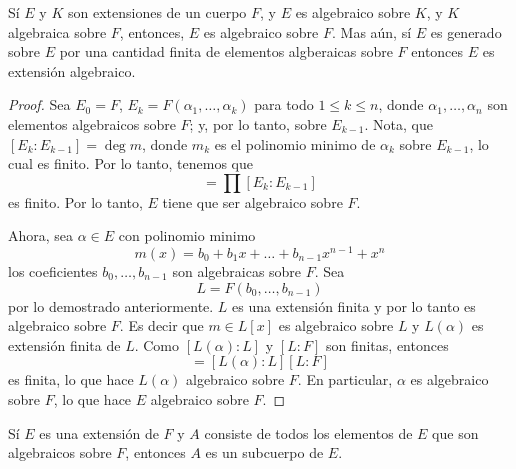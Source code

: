 \begin{lemma}\label{lemma_88}
    S\'i $E$ y  $K$ son extensiones de un cuerpo  $F$, y  $E$ es algebraico
    sobre  $K$, y  $K$ algebraica sobre  $F$, entonces,  $E$ es algebraico sobre
     $F$. Mas a\'un, s\'i  $E$ es generado sobre  $E$ por una cantidad finita de
     elementos algberaicas sobre  $F$ entonces  $E$ es extensi\'on algebraico.
\end{lemma}
\begin{proof}
    Sea $E_0=F$, $E_k=F(\alpha_1, \dots, \alpha_k)$ para todo $1 \leq k \leq n$,
    donde  $\alpha_1, \dots, \alpha_n$ son elementos algebraicos sobre $F$; y,
    por lo tanto, sobre $E_{k-1}$. Nota, que $[E_k:E_{k-1}]=\deg{m}$, donde $m_k$
    es el polinomio minimo de  $\alpha_k$ sobre $E_{k-1}$, lo cual es finito.
    Por lo tanto, tenemos que
    \begin{equation*}
        [E:F]=\prod{[E_k:E_{k-1}]}
    \end{equation*}
    es finito. Por lo tanto, $E$ tiene que ser algebraico sobre  $F$.

    Ahora, sea $\alpha \in E$ con polinomio minimo
    \begin{equation*}
        m(x)=b_0+b_1x+\dots+b_{n-1}x^{n-1}+x^n
    \end{equation*}
    los coeficientes $b_0, \dots, b_{n-1}$ son algebraicas sobre $F$. Sea
    \begin{equation*}
        L=F(b_0, \dots, b_{n-1})
    \end{equation*}
    por lo demostrado anteriormente. $L$ es una extensi\'on finita y por lo
    tanto es algebraico sobre  $F$. Es decir que  $m \in L[x]$ es algebraico
    sobre $L$ y  $L(\alpha)$ es extensi\'on finita de $L$. Como $[L(\alpha):L]$
    y $[L:F]$ son finitas, entonces
    \begin{equation*}
        [L(\alpha) : F]=[L(\alpha):L][L:F]
    \end{equation*}
    es finita, lo que hace $L(\alpha)$ algebraico sobre $F$. En particular,
    $\alpha$ es algebraico sobre  $F$, lo que hace  $E$ algebraico sobre  $F$.
\end{proof}
\begin{corollary}
    S\'i $E$ es una extensi\'on de  $F$ y $A$ consiste de todos los elementos de
    $E$ que son algebraicos sobre  $F$, entonces  $A$ es un subcuerpo de  $E$.
\end{corollary}
